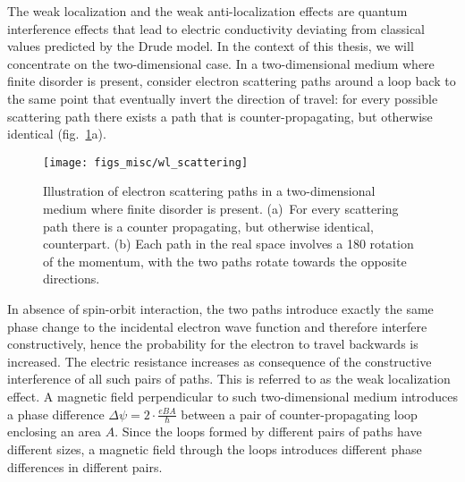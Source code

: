 The weak localization and the weak anti-localization effects are quantum interference effects that lead to electric conductivity deviating from classical values predicted by the Drude model. In the context of this thesis, we will concentrate on the two-dimensional case. In a two-dimensional medium where finite disorder is present, consider electron scattering paths around a loop back to the same point that eventually invert the direction of travel: for every possible scattering path there exists a path that is counter-propagating, but otherwise identical (fig.~\ref{fig:bg_scattering}a).%
\begin{figure}[ht]%
    \centering%
    \texttt{[image: figs\_misc/wl\_scattering]}%
    \caption[Illustrations of electron scattering paths in two-dimensions.]{\label{fig:bg_scattering}Illustration of electron scattering paths in a two-dimensional medium where finite disorder is present. (a)~For every scattering path there is a counter propagating, but otherwise identical, counterpart. (b) Each path in the real space involves a 180\degree{} rotation of the momentum, with the two paths rotate towards the opposite directions.}%
\end{figure}%

In absence of spin-orbit interaction, the two paths introduce exactly the same phase change to the incidental electron wave function and therefore interfere constructively, hence the probability for the electron to travel backwards is increased. The electric resistance increases as consequence of the constructive interference of all such pairs of paths. This is referred to as the weak localization effect. A magnetic field perpendicular to such two-dimensional medium introduces a phase difference $\Delta\psi = 2\cdot\frac{eBA}{\hbar}$ between a pair of counter-propagating loop enclosing an area $A$. Since the loops formed by different pairs of paths have different sizes, a magnetic field through the loops introduces different phase differences in different pairs.